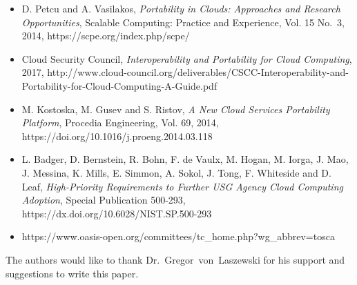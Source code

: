 \begin{itemize}
\item
  D. Petcu and A. Vasilakos, \emph{Portability in Clouds: Approaches and
  Research Opportunities}, Scalable Computing: Practice and Experience,
  Vol. 15 No.~3, 2014, https://scpe.org/index.php/scpe/
\item
  Cloud Security Council, \emph{Interoperability and Portability for
  Cloud Computing}, 2017,
  http://www.cloud-council.org/deliverables/CSCC-Interoperability-and-Portability-for-Cloud-Computing-A-Guide.pdf
\item
  M. Kostoska, M. Gusev and S. Ristov, \emph{A New Cloud Services
  Portability Platform}, Procedia Engineering, Vol. 69, 2014,
  https://doi.org/10.1016/j.proeng.2014.03.118
\item
  L. Badger, D. Bernstein, R. Bohn, F. de Vaulx, M. Hogan, M. Iorga, J.
  Mao, J. Messina, K. Mills, E. Simmon, A. Sokol, J. Tong, F. Whiteside
  and D. Leaf, \emph{High-Priority Requirements to Further USG Agency
  Cloud Computing Adoption}, Special Publication 500-293,
  https://dx.doi.org/10.6028/NIST.SP.500-293
\item
  https://www.oasis-open.org/committees/tc\_home.php?wg\_abbrev=tosca
\end{itemize}


\begin{acks}

  The authors would like to thank Dr.~Gregor~von~Laszewski for his
  support and suggestions to write this paper.

\end{acks}


 

